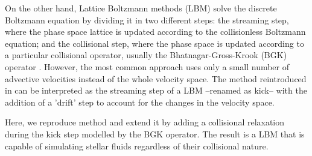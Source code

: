 \documentclass[fleqn,usenatbib]{mnras}
\begin{document}
On the other hand, Lattice Boltzmann methods (LBM) solve the discrete Boltzmann equation by dividing it in two different steps: the streaming step, where the phase space lattice is updated according to the collisionless Boltzmann equation; and the collisional step, where the phase space is updated according to a particular collisional operator, usually the Bhatnagar-Gross-Krook (BGK) operator \citep{1954PhRv...94..511B}. However, the most common approach uses only a small number of advective velocities instead of the whole velocity space. 
The method reintroduced in \citet{integerLatticeDynamics} can be interpreted as the streaming step of a LBM --renamed as kick-- with the addition of a 'drift' step to account for the changes in the velocity space.

Here, we reproduce \citeauthor{integerLatticeDynamics} method and extend it by adding a collisional relaxation during the kick step modelled by the BGK operator. The result is a LBM that is capable of simulating stellar fluids regardless of their collisional nature. 

\end{document}
